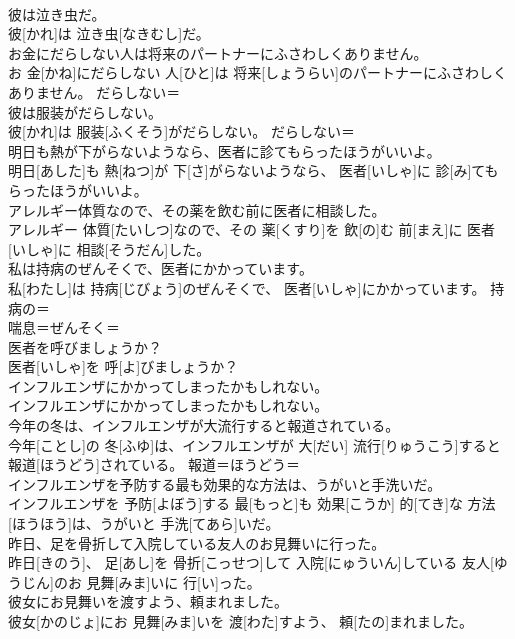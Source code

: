 \documentclass[8pt]{extreport}
\begin{document}
\begin{CJK}{UTF8}{min}
\\	彼は泣き虫だ。	
\\	彼[かれ]は 泣き虫[なきむし]だ。	
\\	お金にだらしない人は将来のパートナーにふさわしくありません。	
\\	お 金[かね]にだらしない 人[ひと]は 将来[しょうらい]のパートナーにふさわしくありません。	だらしない＝ 
\\	彼は服装がだらしない。	
\\	彼[かれ]は 服装[ふくそう]がだらしない。	だらしない＝ 
\\	明日も熱が下がらないようなら、医者に診てもらったほうがいいよ。	
\\	明日[あした]も 熱[ねつ]が 下[さ]がらないようなら、 医者[いしゃ]に 診[み]てもらったほうがいいよ。	
\\	アレルギー体質なので、その薬を飲む前に医者に相談した。	
\\	アレルギー 体質[たいしつ]なので、その 薬[くすり]を 飲[の]む 前[まえ]に 医者[いしゃ]に 相談[そうだん]した。	
\\	私は持病のぜんそくで、医者にかかっています。	
\\	私[わたし]は 持病[じびょう]のぜんそくで、 医者[いしゃ]にかかっています。	持病の＝ 
\\	喘息＝ぜんそく＝ 
\\	医者を呼びましょうか？	
\\	医者[いしゃ]を 呼[よ]びましょうか？	
\\	インフルエンザにかかってしまったかもしれない。	
\\	インフルエンザにかかってしまったかもしれない。	
\\	今年の冬は、インフルエンザが大流行すると報道されている。	
\\	今年[ことし]の 冬[ふゆ]は、インフルエンザが 大[だい] 流行[りゅうこう]すると 報道[ほうどう]されている。	報道＝ほうどう＝ 
\\	インフルエンザを予防する最も効果的な方法は、うがいと手洗いだ。	
\\	インフルエンザを 予防[よぼう]する 最[もっと]も 効果[こうか] 的[てき]な 方法[ほうほう]は、うがいと 手洗[てあら]いだ。	
\\	昨日、足を骨折して入院している友人のお見舞いに行った。	
\\	昨日[きのう]、 足[あし]を 骨折[こっせつ]して 入院[にゅういん]している 友人[ゆうじん]のお 見舞[みま]いに 行[い]った。	
\\	彼女にお見舞いを渡すよう、頼まれました。	
\\	彼女[かのじょ]にお 見舞[みま]いを 渡[わた]すよう、 頼[たの]まれました。	

\end{CJK}
\end{document}
